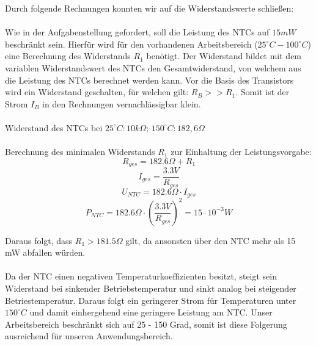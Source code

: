 \newpage
\noindent
Durch folgende Rechnungen konnten wir auf die Widerstandswerte schließen: \\
\\
Wie in der Aufgabenstellung gefordert, soll die Leistung des NTCs auf $15 mW$ beschränkt sein. Hierfür wird für den vorhandenen Arbeitsbereich ($25^{\circ} C - 100^{\circ} C$) eine Berechnung des Widerstands $R_1$ benötigt. Der Widerstand bildet mit dem variablen Widerstandswert des NTCs den Gesamtwiderstand, von welchem aus die Leistung des NTCs berechnet werden kann. Vor die Basis des Transistors wird ein Widerstand geschalten, für welchen gilt: $R_B >> R_1$. Somit ist der Strom $I_B$ in den Rechnungen vernachlässigbar klein.\\
\\
Widerstand des NTCs bei $25^{\circ} C: 10 k\Omega$; $150^{\circ} C: 182,6 \Omega$ \cite{ntc} \\
\\
Berechnung des minimalen Widerstands $R_1$ zur Einhaltung der Leistungsvorgabe:
\[ R_{ges} = 182.6 \Omega + R_1 \]
\[ I_{ges} = \frac{3.3 V}{R_{ges}} \]
\[ U_{NTC} = 182.6 \Omega \cdot I_{ges} \]
\[ P_{NTC} = 182.6 \Omega \cdot \left(\frac{3.3 V}{R_{ges}}\right)^2 = 15\cdot10^{-3} W \]


\noindent
Daraus folgt, dass $R_1 > 181.5 \Omega$ gilt, da ansonsten über den NTC mehr als 15 mW abfallen würden. \\
\\
Da der NTC einen negativen Temperaturkoeffizienten besitzt, steigt sein Widerstand bei sinkender Betriebstemperatur und sinkt analog bei steigender Betriestemperatur. Daraus folgt ein geringerer Strom für Temperaturen unter $150^{\circ} C$ und damit einhergehend eine geringere Leistung am NTC. Unser Arbeitsbereich beschränkt sich auf 25 - 150 Grad, somit ist diese Folgerung ausreichend für unseren Anwendungsbereich. \\

